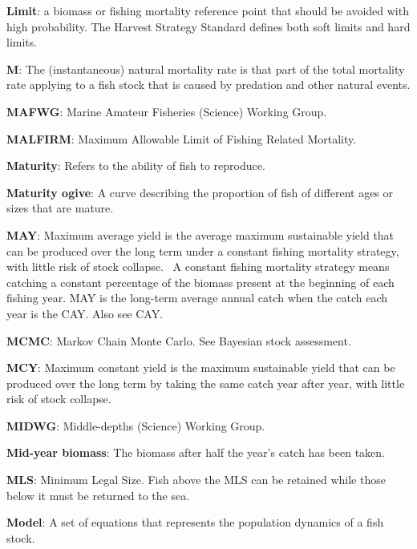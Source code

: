 \documentclass{mpi-plenary}
\theoremstyle{definition}
\theoremstyle{definition}
\theoremstyle{definition}
\theoremstyle{remark}
\begin{document}
\protect\hypertarget{def-limit}{}{} \textbf{Limit}: a biomass or fishing
mortality reference point that should be avoided with high probability.
The Harvest Strategy Standard defines both soft limits and hard limits.

\protect\hypertarget{def-m}{}{} \textbf{M}: The (instantaneous) natural
mortality rate is that part of the total mortality rate applying to a
fish stock that is caused by predation and other natural events.

\protect\hypertarget{def-mafwg}{}{} \textbf{MAFWG}: Marine Amateur
Fisheries (Science) Working Group.

\protect\hypertarget{def-malfirm}{}{} \textbf{MALFIRM}: Maximum
Allowable Limit of Fishing Related Mortality.

\protect\hypertarget{def-maturity}{}{} \textbf{Maturity}: Refers to the
ability of fish to reproduce.

\protect\hypertarget{def-maturity-ogive}{}{} \textbf{Maturity ogive}: A
curve describing the proportion of fish of different ages or sizes that
are mature.

\protect\hypertarget{def-may}{}{} \textbf{MAY}: Maximum average yield is
the average maximum sustainable yield that can be produced over the long
term under a constant fishing mortality strategy, with little risk of
stock collapse.~ A constant fishing mortality strategy means catching a
constant percentage of the biomass present at the beginning of each
fishing year. MAY is the long-term average annual catch when the catch
each year is the CAY. Also see CAY.

\protect\hypertarget{def-mcmc}{}{} \textbf{MCMC}: Markov Chain Monte
Carlo. See Bayesian stock assessment.

\protect\hypertarget{def-mcy}{}{} \textbf{MCY}: Maximum constant yield
is the maximum sustainable yield that can be produced over the long term
by taking the same catch year after year, with little risk of stock
collapse.

\protect\hypertarget{def-midwg}{}{} \textbf{MIDWG}: Middle-depths
(Science) Working Group.

\protect\hypertarget{def-mid-year-biomass}{}{} \textbf{Mid-year
biomass}: The biomass after half the year's catch has been taken.

\protect\hypertarget{def-mls}{}{} \textbf{MLS}: Minimum Legal Size. Fish
above the MLS can be retained while those below it must be returned to
the sea.

\protect\hypertarget{def-model}{}{} \textbf{Model}: A set of equations
that represents the population dynamics of a fish stock.
\end{document}
